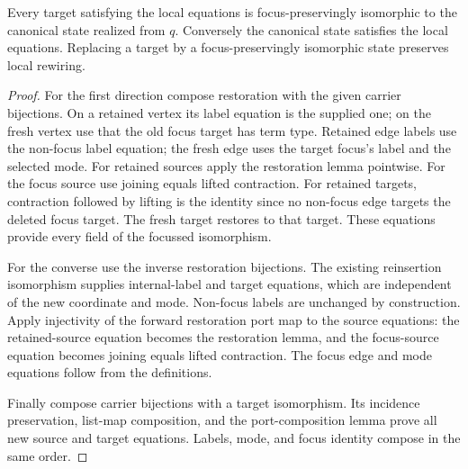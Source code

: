 \begin{theorem}
Every target satisfying the local equations is focus-preservingly isomorphic
to the canonical state realized from $q$. Conversely the canonical state
satisfies the local equations. Replacing a target by a focus-preservingly
isomorphic state preserves local rewiring.
\end{theorem}
\begin{proof}
For the first direction compose restoration with the given carrier bijections.
On a retained vertex its label equation is the supplied one; on the fresh
vertex use that the old focus target has term type. Retained edge labels use
the non-focus label equation; the fresh edge uses the target focus's label
and the selected mode. For retained sources apply the restoration lemma
pointwise. For the focus source use joining equals lifted contraction.
For retained targets, contraction followed by lifting is the identity since
no non-focus edge targets the deleted focus target. The fresh target restores
to that target. These equations provide every field of the focussed isomorphism.

For the converse use the inverse restoration bijections. The existing
reinsertion isomorphism supplies internal-label and target equations, which
are independent of the new coordinate and mode. Non-focus labels are unchanged
by construction. Apply injectivity of the forward restoration port map to the
source equations: the retained-source equation becomes the restoration lemma,
and the focus-source equation becomes joining equals lifted contraction.
The focus edge and mode equations follow from the definitions.

Finally compose carrier bijections with a target isomorphism. Its incidence
preservation, list-map composition, and the port-composition lemma prove all
new source and target equations. Labels, mode, and focus identity compose
in the same order.
\end{proof}

